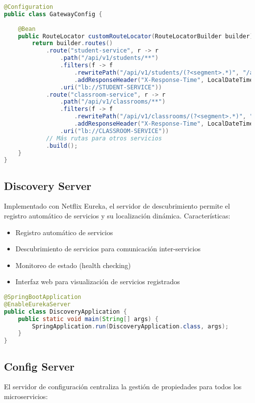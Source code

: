 \documentclass[12pt,a4paper]{report}
\begin{document}
\begin{lstlisting}[language=Java, caption=Configuración de rutas en el API Gateway]
@Configuration
public class GatewayConfig {
    
    @Bean
    public RouteLocator customRouteLocator(RouteLocatorBuilder builder) {
        return builder.routes()
            .route("student-service", r -> r
                .path("/api/v1/students/**")
                .filters(f -> f
                    .rewritePath("/api/v1/students/(?<segment>.*)", "/api/v1/${segment}")
                    .addResponseHeader("X-Response-Time", LocalDateTime.now().toString()))
                .uri("lb://STUDENT-SERVICE"))
            .route("classroom-service", r -> r
                .path("/api/v1/classrooms/**")
                .filters(f -> f
                    .rewritePath("/api/v1/classrooms/(?<segment>.*)", "/api/v1/${segment}")
                    .addResponseHeader("X-Response-Time", LocalDateTime.now().toString()))
                .uri("lb://CLASSROOM-SERVICE"))
            // Más rutas para otros servicios
            .build();
    }
}
\end{lstlisting}

\subsection{Discovery Server}
Implementado con Netflix Eureka, el servidor de descubrimiento permite el registro automático de servicios y su localización dinámica. Características:

\begin{itemize}
    \item Registro automático de servicios
    \item Descubrimiento de servicios para comunicación inter-servicios
    \item Monitoreo de estado (health checking)
    \item Interfaz web para visualización de servicios registrados
\end{itemize}

\begin{lstlisting}[language=Java, caption=Configuración del servidor Eureka]
@SpringBootApplication
@EnableEurekaServer
public class DiscoveryApplication {
    public static void main(String[] args) {
        SpringApplication.run(DiscoveryApplication.class, args);
    }
}
\end{lstlisting}

\subsection{Config Server}
El servidor de configuración centraliza la gestión de propiedades para todos los microservicios:
\end{document}
